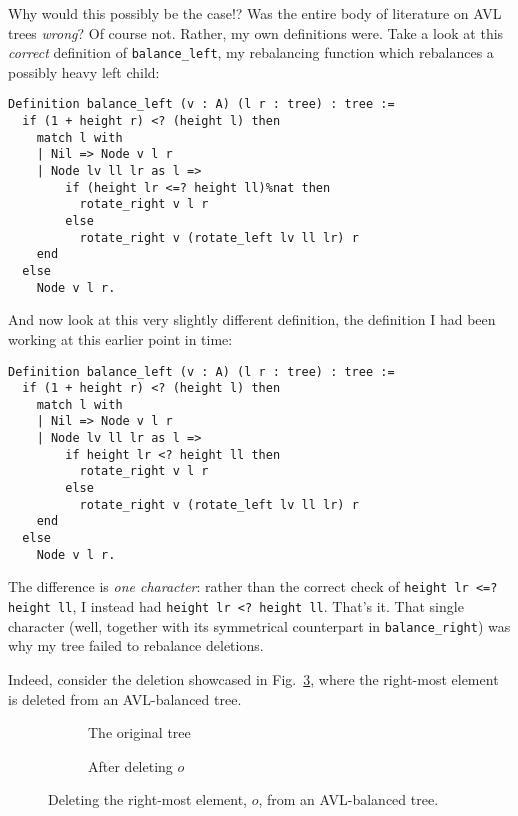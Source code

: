 \documentclass[acmsmall, authorversion, nonacm, overload]{acmart}
\begin{document}
Why would this possibly be the case!? Was the entire body of literature on AVL trees \emph{wrong}?
Of course not.
Rather, my own definitions were.
Take a look at this \emph{correct} definition of \verb|balance_left|,
my rebalancing function which rebalances a possibly heavy left child:
\begin{verbatim}
Definition balance_left (v : A) (l r : tree) : tree :=
  if (1 + height r) <? (height l) then
    match l with
    | Nil => Node v l r
    | Node lv ll lr as l =>
        if (height lr <=? height ll)%nat then
          rotate_right v l r
        else
          rotate_right v (rotate_left lv ll lr) r
    end
  else
    Node v l r.
\end{verbatim}
And now look at this very slightly different definition, the definition I had been working at this earlier
point in time:
\begin{verbatim}
Definition balance_left (v : A) (l r : tree) : tree :=
  if (1 + height r) <? (height l) then
    match l with
    | Nil => Node v l r
    | Node lv ll lr as l =>
        if height lr <? height ll then
          rotate_right v l r
        else
          rotate_right v (rotate_left lv ll lr) r
    end
  else
    Node v l r.
\end{verbatim}
The difference is \emph{one character}:
rather than the correct check of \texttt{height lr <=? height ll},
I instead had \texttt{height lr <? height ll}.
That's it.
That single character (well, together with its symmetrical counterpart in \verb|balance_right|)
was why my tree failed to rebalance deletions.

Indeed, consider the deletion showcased in Fig.\ \ref{fig:deletion_fig},
where the right-most element is deleted from an AVL-balanced tree.
\begin{figure}[!ht]
  \centering
  \begin{subfigure}{0.5\textwidth}
    \centering
  \caption{The original tree%
  \label{fig:before_deletion}}
  \end{subfigure}%
  \begin{subfigure}{0.5\textwidth}
    \centering
  \caption{After deleting $o$%
  \label{fig:after_deletion}}
  \end{subfigure}
  \caption{Deleting the right-most element, $o$, from an AVL-balanced tree.%
  \label{fig:deletion_fig}}
\end{figure}
\end{document}
